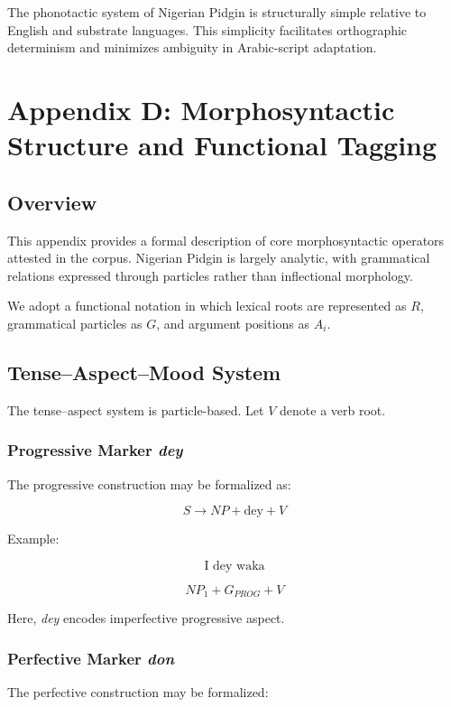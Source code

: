 \documentclass[12pt]{article}
\begin{document}
The phonotactic system of Nigerian Pidgin is structurally simple relative to English and substrate languages. This simplicity facilitates orthographic determinism and minimizes ambiguity in Arabic-script adaptation.

\section{Appendix D: Morphosyntactic Structure and Functional Tagging}

\subsection{Overview}

This appendix provides a formal description of core morphosyntactic operators attested in the corpus. Nigerian Pidgin is largely analytic, with grammatical relations expressed through particles rather than inflectional morphology.

We adopt a functional notation in which lexical roots are represented as \( R \), grammatical particles as \( G \), and argument positions as \( A_i \).

\subsection{Tense–Aspect–Mood System}

The tense–aspect system is particle-based. Let \( V \) denote a verb root.

\subsubsection*{Progressive Marker \textit{dey}}

The progressive construction may be formalized as:

\[
S \rightarrow NP + \text{dey} + V
\]

Example:

\[
\text{I dey waka}
\]

\[
NP_1 + G_{PROG} + V
\]

Here, \textit{dey} encodes imperfective progressive aspect.

\subsubsection*{Perfective Marker \textit{don}}

The perfective construction may be formalized:
\end{document}
